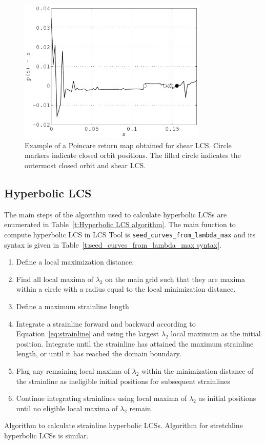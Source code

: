 \documentclass{article}
\begin{document}
\begin{figure}
\begin{center}
\includegraphics[width=0.8\textwidth]{graphics/double_gyre/poincare_return_map}
\end{center}
\caption{Example of a Poincare return map obtained for shear LCS. Circle markers indicate closed orbit positions. The filled circle indicates the outermost closed orbit and shear LCS.}
\label{f:Poincare return map}
\end{figure}

\subsection{Hyperbolic LCS}

The main steps of the algorithm used to calculate hyperbolic LCSs are enumerated in Table~\ref{t:Hyperbolic LCS algorithm}. The main function to compute hyperbolic LCS in LCS Tool is \lstinline!seed_curves_from_lambda_max! and its syntax is given in Table~\ref{t:seed_curves_from_lambda_max syntax}.

\begin{table}
\begin{enumerate}
\item Define a local maximization distance.
\item Find all local maxima of $\lambda_2$ on the main grid such that they are maxima within a circle with a radius equal to the local minimization distance.
\item Define a maximum strainline length
\item Integrate a strainline forward and backward according to Equation~\eqref{eq:strainline} and using the largest $\lambda_2$ local maximum as the initial position. Integrate until the strainline has attained the maximum strainline length, or until it has reached the domain boundary.
\item Flag any remaining local maxima of $\lambda_2$ within the minimization distance of the strainline as ineligible initial positions for subsequent strainlines
\item Continue integrating strainlines using local maxima of $\lambda_2$ as initial positions until no eligible local maxima of $\lambda_2$ remain.
\end{enumerate}
\caption{Algorithm to calculate strainline hyperbolic LCSs. Algorithm for stretchline hyperbolic LCSs is similar.}
\label{t:Hyperbolic LCS algorithm}
\end{table}
\end{document}
